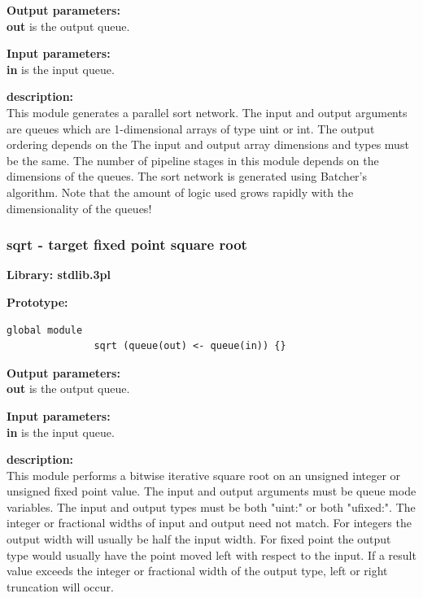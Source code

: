             {\bf Output parameters:} \\
            {\bf out} is the output queue.

            {\bf Input parameters:} \\
            {\bf in} is the input queue.

            {\bf description:} \\
            This module generates a parallel sort network. The input and output
            arguments are queues which are 1-dimensional arrays of type uint or
            int. The output ordering depends on the The input and output array
            dimensions and types must be the same. The number of pipeline
            stages in this module depends on the dimensions of the queues. The
            sort network is generated using Batcher's algorithm. Note that the
            amount of logic used grows rapidly with the dimensionality of the
            queues!



        \subsubsection{sqrt - target fixed point square root}\label{sec:lmsqrt}

            {\bf Library: stdlib.3pl}

            {\bf Prototype:} \\
            \vsp
            \begin{lstlisting}[gobble=12, language=threepl]
               global module
               sqrt (queue(out) <- queue(in)) {}
            \end{lstlisting}

            {\bf Output parameters:} \\
            {\bf out} is the output queue.

            {\bf Input parameters:} \\
            {\bf in} is the input queue.

            {\bf description:} \\
            This module performs a bitwise iterative square root on an unsigned
            integer or unsigned fixed point value. The input and output
            arguments must be queue mode variables. The input and output types
            must be both "uint:" or both "ufixed:". The integer or fractional
            widths of input and output need not match. For integers the output
            width will usually be half the input width. For fixed point the
            output type would usually have the point moved left with respect to
            the input. If a result value exceeds the integer or fractional width
            of the output type, left or right truncation will occur.

